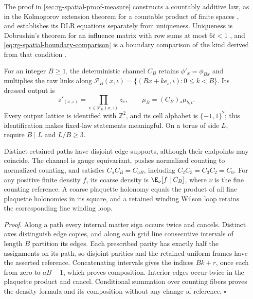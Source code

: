 The proof in \cref{sec:rg-spatial-proof-measure} constructs a countably
additive law, as in the Kolmogorov extension theorem for a countable
product of finite spaces \citep{Kallenberg2021}, and establishes its DLR
equations separately from uniqueness. Uniqueness is Dobrushin's theorem for
an influence matrix with row sums at most \(6t<1\)
\citep{Dobrushin1968}\citep[Sec.~8.1]{Georgii1988}, and
\cref{eq:rg-spatial-boundary-comparison} is a boundary comparison of the
kind derived from that condition \citep[Ch.~8]{Georgii1988}.

For an integer \(B\ge1\), the deterministic channel \(C_B\) retains
\(\phi'_x=\phi_{Bx}\) and multiplies the raw links along
\(\mathcal P_B(x,\iota)=\{(Bx+ke_\iota,\iota):0\le k<B\}\). Its dressed
output is
\begin{equation}
 z'_{(x,\iota)}=\prod_{e\in\mathcal P_B(x,\iota)}z_e,
 \qquad \mu_B=(C_B)_*\mu_{b,t}.
 \label{eq:rg-spatial-path-channel}
\end{equation}
Every output lattice is identified with \(\mathbb Z^2\), and its cell
alphabet is \(\{-1,1\}^2\); this identification makes fixed-law
statements meaningful. On a torus of side \(L\), require \(B\mid L\) and
\(L/B\ge3\).

Distinct retained paths have disjoint edge supports, although their
endpoints may coincide. The channel is gauge equivariant, pushes normalized
counting to normalized counting, and satisfies \(C_aC_B=C_{aB}\), including
\(C_2C_3=C_3C_2=C_6\). For any positive finite density \(f\), its coarse
density is \(\E_{\nu}[f\mid C_B]\), where \(\nu\) is the fine counting
reference. A coarse plaquette holonomy equals the product of all fine
plaquette holonomies in its square, and a retained winding Wilson loop
retains the corresponding fine winding loop. 

\noindent\emph{Proof.}
Along a path every internal matter sign occurs twice and cancels. Distinct
axes distinguish edge copies, and along each grid line consecutive intervals
of length \(B\) partition its edges. Each prescribed parity has exactly half
the assignments on its path, so disjoint parities and the retained uniform
frames have the asserted reference. Concatenating intervals gives the
indices \(Bk+r\), once each from zero to \(aB-1\), which proves
composition. Interior edges occur twice in the plaquette product and
cancel. Conditional summation over counting fibers proves the density
formula and its composition without any change of reference.
\hfill\(\square\)

